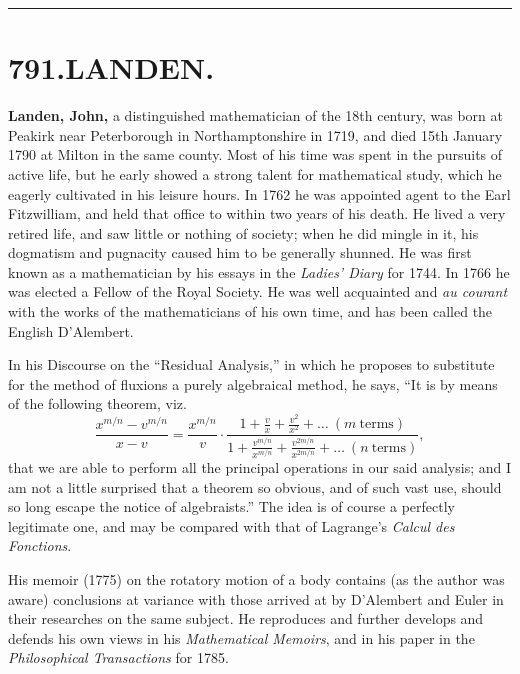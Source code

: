 \documentclass[11pt,a4paper]{article}
\begin{document}
\vspace{1em}
\hrule
\vspace{1em}



\section*{791.\quad LANDEN.}


\smallskip

\textbf{Landen, John,} a distinguished mathematician of the 18th century, was born at Peakirk near Peterborough in Northamptonshire in 1719, and died 15th January 1790 at Milton in the same county. Most of his time was spent in the pursuits of active life, but he early showed a strong talent for mathematical study, which he eagerly cultivated in his leisure hours. In 1762 he was appointed agent to the Earl Fitzwilliam, and held that office to within two years of his death. He lived a very retired life, and saw little or nothing of society; when he did mingle in it, his dogmatism and pugnacity caused him to be generally shunned. He was first known as a mathematician by his essays in the \textit{Ladies' Diary} for 1744. In 1766 he was elected a Fellow of the Royal Society. He was well acquainted and \textit{au courant} with the works of the mathematicians of his own time, and has been called the English D'Alembert.

In his Discourse on the ``Residual Analysis,'' in which he proposes to substitute for the method of fluxions a purely algebraical method, he says, ``It is by means of the following theorem, viz.
\[
\frac{x^{m/n} - v^{m/n}}{x - v} = \frac{x^{m/n}}{v} \cdot \frac{1 + \frac{v}{x} + \frac{v^{2}}{x^{2}} + \ldots\ (m\ \text{terms})}{1 + \frac{v^{m/n}}{x^{m/n}} + \frac{v^{2m/n}}{x^{2m/n}} + \ldots\ (n\ \text{terms})},
\]
that we are able to perform all the principal operations in our said analysis; and I am not a little surprised that a theorem so obvious, and of such vast use, should so long escape the notice of algebraists.'' The idea is of course a perfectly legitimate one, and may be compared with that of Lagrange's \textit{Calcul des Fonctions}.

His memoir (1775) on the rotatory motion of a body contains (as the author was aware) conclusions at variance with those arrived at by D'Alembert and Euler in their researches on the same subject. He reproduces and further develops and defends his own views in his \textit{Mathematical Memoirs}, and in his paper in the \textit{Philosophical Transactions} for 1785.
\end{document}
